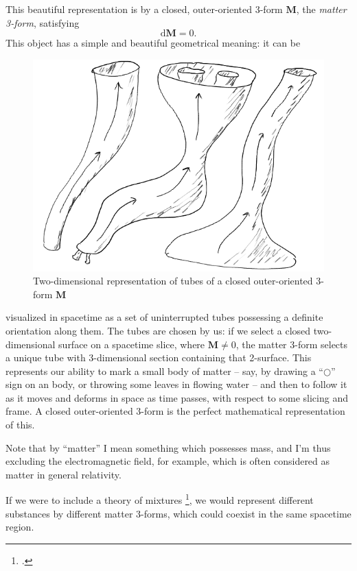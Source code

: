 \documentclass[\ifafour a4paper,12pt,\else a5paper,10pt,\fi%
onecolumn,oneside,article,%
british%
]{memoir}
\theoremstyle{remark}
\theoremstyle{innote}
\newcommand*{\citep}{\footcites}%
\newcommand*{\di}{\mathrm{d}}%
\renewcommand*{\|}{\nonscript\,\vert\nonscript\;\mathopen{}}
\newcommand*{\eg}{{e.g.}}
\newcommand*{\yrr}{M}
\newcommand*{\yr}{\bm{\yrr}}
\begin{document}
This beautiful representation is by a closed, outer-oriented 3-form $\yr$,
the \emph{matter 3-form}, satisfying
\begin{equation}
  \label{eq:mass_density_closed_three_form}
  \di\yr=0.
\end{equation}
This object has a simple and beautiful geometrical meaning: it can be
\setlength{\intextsep}{0.0ex}%
\begin{figure}
  \includegraphics[width=\linewidth]{mass_tubes2.png}\\
  \centering\footnotesize Two-dimensional representation of tubes of a
  closed outer-oriented 3-form $\yr$
\end{figure}
visualized in spacetime as a set of uninterrupted tubes possessing a
definite orientation along them. The tubes are chosen by us: if we select a
closed two-dimensional surface on a spacetime slice, where $\yr \ne 0$, the
matter 3-form selects a unique tube with 3-dimensional section containing
that 2-surface. This represents our ability to mark a small body of matter
-- say, by drawing a \enquote{$\mathord{\bigcirc}$} sign on an body, or
throwing some leaves in flowing water -- and then to follow it as it moves
and deforms in space as time passes, with respect to some slicing and
frame. A closed outer-oriented 3-form is the perfect mathematical
representation of this.

Note that by \enquote{matter} I mean something which possesses mass, and
I'm thus excluding the electromagnetic field, for example, which is often
considered as matter in general relativity.

If we were to include a theory of mixtures
\citep[\eg][app.~5B]{truesdell1969_r1984}, we would represent different
substances by different matter 3-forms, which could coexist in the same
spacetime region.
\end{document}
